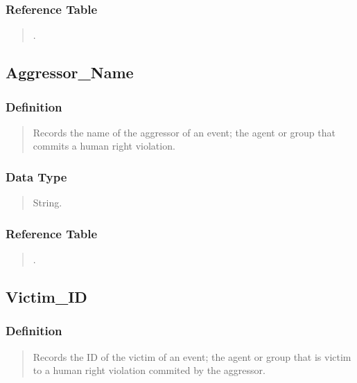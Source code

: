 \documentclass[letterpaper,10pt,english]{sphinxmanual}
\begin{document}
\subsubsection{Reference Table}
\label{\detokenize{database_schema:id4}}\begin{quote}

\sphinxAtStartPar
{\hyperref[\detokenize{database_schema:aggressor-table}]{}} .
\end{quote}


\subsection{Aggressor\_Name}
\label{\detokenize{database_schema:aggressor-name}}

\subsubsection{Definition}
\label{\detokenize{database_schema:id5}}\begin{quote}

\sphinxAtStartPar
Records the name of the aggressor of an event; the agent or group that commits a human right violation.
\end{quote}


\subsubsection{Data Type}
\label{\detokenize{database_schema:id6}}\begin{quote}

\sphinxAtStartPar
String.
\end{quote}


\subsubsection{Reference Table}
\label{\detokenize{database_schema:id7}}\begin{quote}

\sphinxAtStartPar
{\hyperref[\detokenize{database_schema:aggressor-table}]{}}.
\end{quote}


\subsection{Victim\_ID}
\label{\detokenize{database_schema:victim-id}}

\subsubsection{Definition}
\label{\detokenize{database_schema:id8}}\begin{quote}

\sphinxAtStartPar
Records the ID of the victim of an event; the agent or group that is victim to a human right violation commited by the aggressor.
\end{quote}
\end{document}
